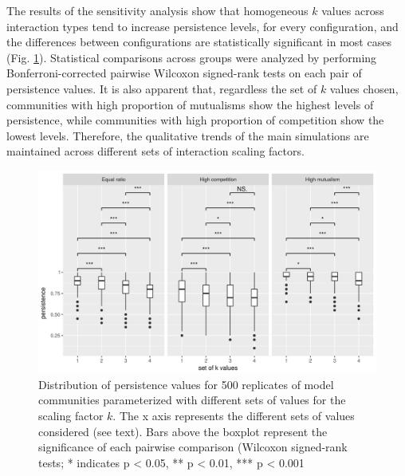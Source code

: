 The results of the sensitivity analysis show that homogeneous \(k\) values across interaction types tend to increase persistence levels, for every configuration, and the differences between configurations are statistically significant in most cases (Fig. \ref{fig:figApp3.3.4}). Statistical comparisons across groups were analyzed by performing Bonferroni-corrected pairwise Wilcoxon signed-rank tests on each pair of persistence values. It is also apparent that, regardless the set of \(k\) values chosen, communities with high proportion of mutualisms show the highest levels of persistence, while communities with high proportion of competition show the lowest levels. Therefore, the qualitative trends of the main simulations are maintained across different sets of interaction scaling factors.

\begin{figure}[!ht]
\centering
\includegraphics[width=\textwidth]{./Figures/Appendix3_3/Fig_4.png}
\caption[Sensitivity analysis]{\color{Gray} Distribution of persistence values for 500 replicates of model communities parameterized with different sets of values for the scaling factor \(k\). The x axis represents the different sets of values considered (see text). Bars above the boxplot represent the significance of each pairwise comparison (Wilcoxon signed-rank tests; * indicates p \textless{} 0.05, ** p \textless{} 0.01, *** p \textless{} 0.001}
\label{fig:figApp3.3.4}
\end{figure}
